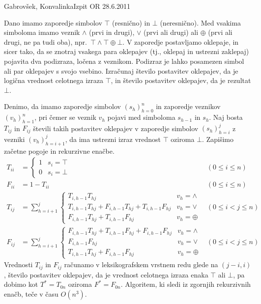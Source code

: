 \begin{naloga}{Gabrovšek, Konvalinka}{Izpit OR 28.6.2011}
\begin{vprasanje}
Dano imamo zaporedje simbolov $\top$ (resnično) in $\bot$ (neresnično).
Med vsakima simboloma imamo veznik $\land$ (prvi in drugi),
$\lor$ (prvi ali drugi) ali $\oplus$ (prvi ali drugi, ne pa tudi oba),
npr.~$\top \land \top \oplus \bot$.
V zaporedje postavljamo oklepaje,
in sicer tako, da se znotraj vsakega para oklepajev
(tj., oklepaj in ustrezni zaklepaj)
pojavita dva podizraza, ločena z veznikom.
Podizraz je lahko posamezen simbol ali par oklepajev s svojo vsebino.
Izračunaj število postavitev oklepajev,
da je logična vrednost celotnega izraza $\top$,
in število postavitev oklepajev, da je rezultat $\bot$.
\end{vprasanje}

\begin{odgovor}
Denimo, da imamo zaporedje simbolov $(s_h)_{h=0}^n$
in zaporedje veznikov $(v_h)_{h=1}^n$,
pri čemer se veznik $v_h$ pojavi med simboloma $s_{h-1}$ in $s_h$.
Naj bosta $T_{ij}$ in $F_{ij}$ števili takih postavitev oklepajev
v zaporedje simbolov $(s_h)_{h=i}^j$ z vezniki $(v_h)_{h=i+1}^j$,
da ima ustrezni izraz vrednost $\top$ oziroma $\bot$.
Zapišimo začetne pogoje in rekurzivne enačbe.
\begin{align*}
T_{ii} &= \begin{cases}
1 & s_i = \top \\
0 & s_i = \bot
\end{cases} & (0 \le i \le n) \\
F_{ii} &= 1 - T_{ii} & (0 \le i \le n) \\
T_{ij} &= \sum_{h=i+1}^j \begin{cases}
T_{i,h-1} T_{hj} & v_h = \land \\
T_{i,h-1} T_{hj} + F_{i,h-1} T_{hj} + T_{i,h-1} F_{hj} & v_h = \lor \\
F_{i,h-1} T_{hj} + T_{i,h-1} F_{hj} & v_h = \oplus
\end{cases} & (0 \le i < j \le n) \\
F_{ij} &= \sum_{h=i+1}^j \begin{cases}
F_{i,h-1} T_{hj} + T_{i,h-1} F_{hj} + F_{i,h-1} F_{hj} & v_h = \land \\
F_{i,h-1} F_{hj} & v_h = \lor \\
T_{i,h-1} T_{hj} + F_{i,h-1} F_{hj} & v_h = \oplus
\end{cases} & (0 \le i < j \le n)
\end{align*}
Vrednosti $T_{ij}$ in $F_{ij}$ računamo
v leksikografskem vrstnem redu glede na $(j-i, i)$,
število postavitev oklepajev,
da je vrednost celotnega izraza enaka $\top$ ali $\bot$,
pa dobimo kot $T^* = T_{0n}$ oziroma $F^* = F_{0n}$.
Algoritem, ki sledi iz zgornjih rekurzivnih enačb, teče v času $O(n^3)$.
\end{odgovor}
\end{naloga}
